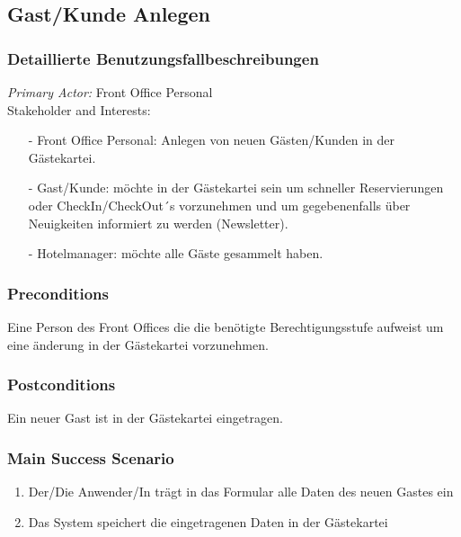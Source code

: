 \documentclass[./detailed_overview_usecases.tex]{subfiles}
\begin{document}
    \subsection{Gast/Kunde Anlegen}
    \subsubsection{Detaillierte Benutzungsfallbeschreibungen}
    \textit{Primary Actor:}
    Front Office Personal
    \\
    Stakeholder and Interests:
    \begin{itemize}
        \item[-] Front Office Personal: Anlegen von neuen Gästen/Kunden in der Gästekartei.
        \item[-] Gast/Kunde: möchte in der Gästekartei sein um schneller Reservierungen oder CheckIn/CheckOut´s vorzunehmen
        und um gegebenenfalls über Neuigkeiten informiert zu werden (Newsletter).
        \item[-] Hotelmanager: möchte alle Gäste gesammelt haben.
    \end{itemize}

    \subsubsection*{Preconditions}
    Eine Person des Front Offices die die benötigte Berechtigungsstufe aufweist um eine änderung in der Gästekartei vorzunehmen.

    \subsubsection*{Postconditions}
    Ein neuer Gast ist in der Gästekartei eingetragen.

    \subsubsection*{Main Success Scenario}
    \begin{enumerate}
        \item Der/Die Anwender/In trägt in das Formular alle Daten des neuen Gastes ein
        \item Das System speichert die eingetragenen Daten in der Gästekartei
    \end{enumerate}
\end{document}
